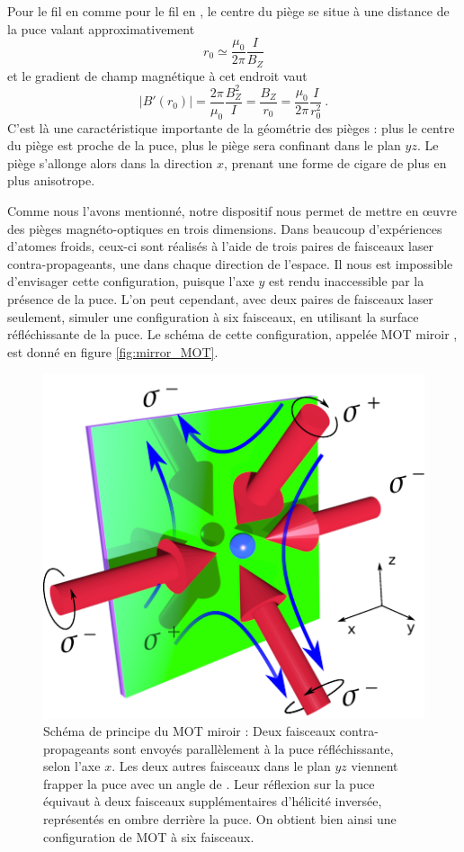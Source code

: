 Pour le fil en  comme pour le fil en , le centre du piège se situe à une distance de la puce valant approximativement
\begin{equation}
\label{eq:trap_center}
r_0 \simeq \frac{\mu _0}{2\pi}\frac{I}{B_Z}
\end{equation}
et le gradient de champ magnétique à cet endroit vaut
\begin{equation}
\label{eq:trap_center_grad}
|B'(r_0)|=\frac{2\pi}{\mu _0} \frac{B_Z^2}{I} = \frac{B_Z}{r_0} = \frac{\mu _0}{2\pi}\frac{I}{r_0^2}~.
\end{equation}
%
C'est là une caractéristique importante de la géométrie des pièges : plus le centre du piège est proche de la puce, plus le piège sera confinant dans le plan $yz$.
Le piège s'allonge alors dans la direction $x$, prenant une forme de cigare de plus en plus anisotrope.

Comme nous l'avons mentionné, notre dispositif nous permet de mettre en \oe uvre des pièges magnéto-optiques en trois dimensions.
Dans beaucoup d'expériences d'atomes froids, ceux-ci sont réalisés à l'aide de trois paires de faisceaux laser contra-propageants, une dans chaque direction de l'espace.
Il nous est impossible d'envisager cette configuration, puisque l'axe $y$ est rendu inaccessible par la présence de la puce.
L'on peut cependant, avec deux paires de faisceaux laser seulement, simuler une configuration à six faisceaux, en utilisant la surface réfléchissante de la puce.
Le schéma de cette configuration, appelée \og MOT miroir \fg{}, est donné en figure \eqref{fig:mirror_MOT}.

\begin{figure}[!h]
\centering
\includegraphics[width=0.6\linewidth]{figures/setup/coldatoms/mirror_MOT}
\caption[Schéma de principe du MOT miroir]{Schéma de principe du MOT miroir :
Deux faisceaux contra-propageants sont envoyés parallèlement à la puce réfléchissante, selon l'axe $x$.
Les deux autres faisceaux dans le plan $yz$ viennent frapper la puce avec un angle de .
Leur réflexion sur la puce équivaut à deux faisceaux supplémentaires d'hélicité inversée, représentés en ombre derrière la puce.
On obtient bien ainsi une configuration de MOT à six faisceaux.
}
\label{fig:mirror_MOT}
\end{figure}


